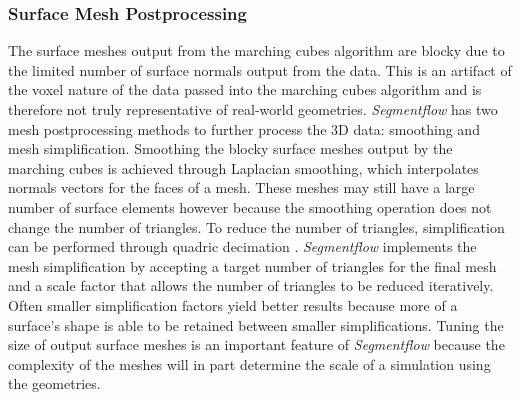 \subsubsection{Surface Mesh Postprocessing}
The surface meshes output from the marching cubes algorithm are blocky due
to the limited number of surface normals output from the data. This is an
artifact of the voxel nature of the data passed into the marching cubes
algorithm and is therefore not truly representative of real-world
geometries. \textit{Segmentflow} has two mesh postprocessing methods to further
process the 3D data: smoothing and mesh simplification.
Smoothing the blocky surface meshes
output by the marching cubes is achieved through Laplacian smoothing,
which interpolates normals vectors for the faces of a mesh. These meshes
may still have a large number of surface elements however because the
smoothing operation does not change the number of triangles. To reduce the
number of triangles, simplification can be performed through quadric
decimation \cite{Garland1997}. \textit{Segmentflow} implements the mesh
simplification by accepting a target number of triangles for the final
mesh and a scale factor that allows the number of triangles to be reduced
iteratively. Often smaller simplification factors yield better results
because more of a surface's shape is able to be retained between smaller
simplifications. Tuning the size of output surface meshes is an important
feature of \textit{Segmentflow} because the complexity of the meshes will
in part determine the scale of a simulation using the geometries.

